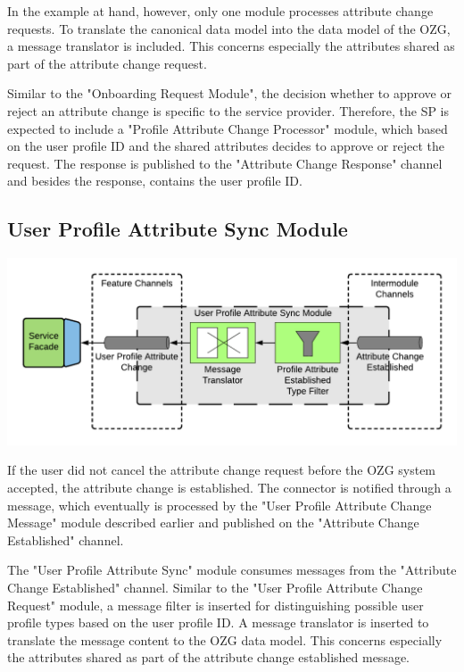 In the example at hand, however, only one module processes attribute change requests. To translate the canonical data model into the data model of the OZG, a message translator is included. This concerns especially the attributes shared as part of the attribute change request.

Similar to the "Onboarding Request Module", the decision whether to approve or reject an attribute change is specific to the service provider. Therefore, the SP is expected to include a "Profile Attribute Change Processor" module, which based on the user profile ID and the shared attributes decides to approve or reject the request. The response is published to the "Attribute Change Response" channel and besides the response, contains the user profile ID.

\subsection{User Profile Attribute Sync Module}

\begin{center}
    \includegraphics[scale=0.6]{Diagrams/Integration Architecture 1/Technological Integration/13. User Profile Attribute Sync Module.pdf}
\end{center}

If the user did not cancel the attribute change request before the OZG system accepted, the attribute change is established. The connector is notified through a message, which eventually is processed by the "User Profile Attribute Change Message" module described earlier and published on the "Attribute Change Established" channel.

The "User Profile Attribute Sync" module consumes messages from the "Attribute Change Established" channel. Similar to the "User Profile Attribute Change Request" module, a message filter is inserted for distinguishing possible user profile types based on the user profile ID. A message translator is inserted to translate the message content to the OZG data model. This concerns especially the attributes shared as part of the attribute change established message.

